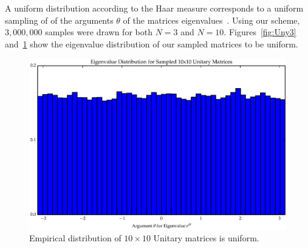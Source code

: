 A uniform distribution according to the Haar measure corresponds to a uniform sampling of of the arguments $\theta$ of the matrices eigenvalues~\cite{Mezzadri2007}. Using our scheme, $3,000,000$ samples were drawn for both $N = 3$ and $N = 10$. Figures~\ref{fig:Uny3} and~\ref{fig:Uny10} show the eigenvalue distribution of our sampled matrices to be uniform.  
\begin{figure}[ht]
\centering
  \includegraphics[scale=0.6, angle=0]{images/unitary_10_hist.eps}
\caption{Empirical distribution of $10\times 10$ Unitary matrices is uniform.}
\label{fig:Uny10}
\end{figure}

 
